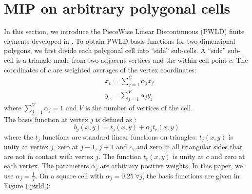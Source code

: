 \section{MIP on arbitrary polygonal cells} \label{sec_mip}
In this section, we introduce the PieceWise Linear Discontinuous (PWLD) finite
elements developed in \cite{pwld_2d,pwld_3d,pwl_diffusion}. To obtain PWLD
basis functions for two-dimensional polygons, we first divide each polygonal
cell into ``side'' sub-cells. A ``side'' sub-cell is a triangle made from two
adjacent vertices and the within-cell point $c$. The coordinates of $c$ are weighted
averages of the vertex coordinates:
\begin{align}
& x_c = \sum_{j=1}^{V} \alpha_{j} x_j\\
& y_c = \sum_{j=1}^{V} \alpha_{j} y_j
\end{align}
where $\sum_{j=1}^{V} \alpha_{j}=1$ and $V$ is the number of vertices of the cell.\\
The basis function at vertex $j$ is defined as \cite{pwld_2d}:
\begin{equation}
b_{j} (x,y) = t_{j}(x,y) + \alpha_j t_c(x,y)
\end{equation}
where the $t_j$ functions are standard linear functions on triangles: $t_j
(x,y)$ is unity at vertex $j$, zero at $j-1$, $j+1$ and $c$, and zero in all
triangular sides that are not in contact with vertex $j$. The function $t_c
(x,y)$ is unity at $c$ and zero at each vertex. The parameters $\alpha_{j}$
are arbitrary positive weights. In this paper, we use 
$\alpha_{j}=\frac{1}{V}$. On a square cell with $\alpha_{j}=0.25\ \forall j$, 
the basis functions are given in Figure (\ref{pwld}):
